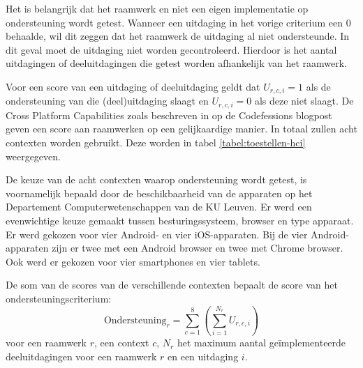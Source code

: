 Het is belangrijk dat het raamwerk en niet een eigen implementatie op ondersteuning wordt getest.
Wanneer een uitdaging in het vorige criterium een $0$ behaalde, wil dit zeggen dat het raamwerk de uitdaging al niet ondersteunde.
In dit geval moet de uitdaging niet worden gecontroleerd.
Hierdoor is het aantal uitdagingen of deeluitdagingen die getest worden afhankelijk van het raamwerk.


Voor een score van een uitdaging of deeluitdaging geldt dat $U_{r,c,i}=1$ als de ondersteuning van die (deel)uitdaging slaagt en $U_{r,c,i}=0$ als deze niet slaagt. 
De Cross Platform Capabilities zoals beschreven in op de Codefessions blogpost~\cite{Sarrafi2012a} geven een score aan raamwerken op een gelijkaardige manier.
In totaal zullen acht contexten worden gebruikt.
Deze worden in tabel \ref{tabel:toestellen-hci} weergegeven.

 \begin{table}
 \centering
 \resizebox{\textwidth}{!} {
 }
 \caption{Acht contexten: apparaten met hun soort, lancering, besturingssysteem~(BS) en browser.}
 \label{tabel:toestellen-hci}
 \end{table}
 
De keuze van de acht contexten waarop ondersteuning wordt getest, is voornamelijk bepaald door de beschikbaarheid van de apparaten op het Departement Computerwetenschappen van de KU Leuven.
Er werd een evenwichtige keuze gemaakt tussen besturingssysteem,  browser en type apparaat.
Er werd gekozen voor vier Android- en vier iOS-apparaten.
Bij de vier Android-apparaten zijn er twee met een Android browser en twee met Chrome browser.
Ook werd er gekozen voor vier smartphones en vier tablets.

De som van de scores van de verschillende contexten bepaalt de score van het ondersteuningscriterium:
\begin{equation}
  \text{Ondersteuning}_r = \sum_{c=1}^{8}{\left(\sum_{i=1}^{N_r}U_{r,c,i}\right)}
  \label{eq:ondersteuning}
\end{equation}
voor  een raamwerk $r$, een context $c$, $N_r$ het maximum aantal geïmplementeerde deeluitdagingen voor een raamwerk $r$ en een uitdaging $i$. 


